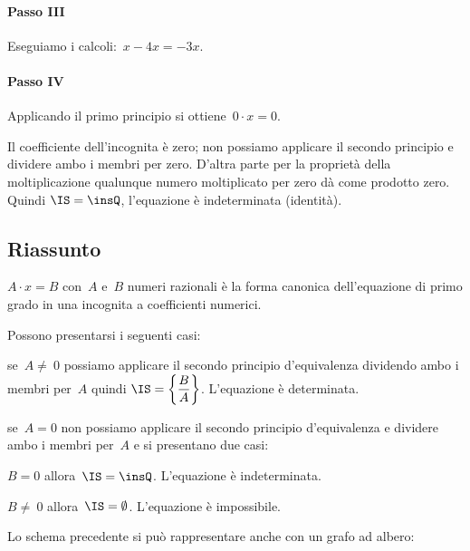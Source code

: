 \begin{exrig}
\begin{esempio}
\paragraph{Passo III} Eseguiamo i calcoli:~$x-4x=-3x$.

\paragraph{Passo IV} Applicando il primo principio si ottiene~$0\cdot x=0$.

Il coefficiente dell'incognita è zero; non possiamo
applicare il secondo principio e dividere ambo i membri per zero.
D'altra parte per la proprietà della moltiplicazione
qualunque numero moltiplicato per zero dà come prodotto zero. Quindi
$\IS = \insQ$, l'equazione è indeterminata (identità).
 \end{esempio}

\end{exrig}

\subsection{Riassunto}
$A\cdot x=B$ con~$A$ e~$B$ numeri
razionali è la forma canonica dell'equazione di primo grado in una
incognita a coefficienti numerici.%

Possono presentarsi i seguenti casi:
 \begin{itemize*}
 \item se~$A\neq~0$ possiamo applicare il secondo principio
d'equivalenza dividendo ambo i membri per~$A$ quindi
$\IS =\left\{\dfrac{B}{A}\right\}$. L'equazione
è determinata.

 \item se~$A=0$ non possiamo applicare il secondo principio
d'equivalenza e dividere ambo i membri per~$A$ e si
presentano due casi:

\begin{itemize*}
 \item $B=0$ allora~$\IS =\insQ$. L'equazione
è indeterminata.

\item $B\neq~0$ allora~$\IS =\emptyset $.
L'equazione è impossibile.
\end{itemize*}


 \end{itemize*}

Lo schema precedente si può rappresentare anche con un grafo ad
albero:
\begin{center}
 
\end{center}


